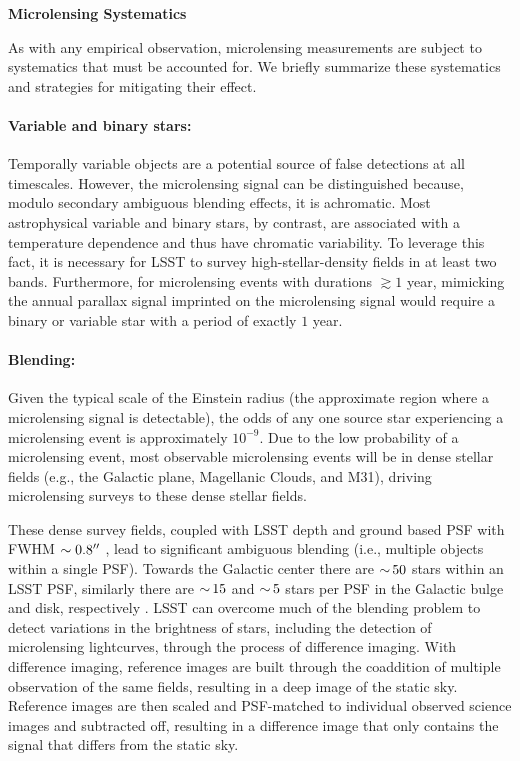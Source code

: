 \noindent \textbf{Microlensing Systematics}

As with any empirical observation, microlensing measurements are subject to systematics that must be accounted for.
We briefly summarize these systematics and strategies for mitigating their effect.

\paragraph{Variable and binary stars:} Temporally variable objects are a potential source of false detections at all timescales. However, the microlensing signal can be distinguished because, modulo secondary ambiguous blending effects, it is achromatic. Most astrophysical variable and binary stars, by contrast, are associated with a temperature dependence and thus have chromatic variability. To leverage this fact, it is necessary for LSST to survey high-stellar-density fields in at least two bands. Furthermore, for microlensing events with durations $\gtrsim 1$ year, mimicking the annual parallax signal imprinted on the microlensing signal would require a binary or variable star with a period of exactly $1$ year.

\paragraph{Blending:} Given the typical scale  of the Einstein radius (the approximate region where a microlensing signal is detectable), the odds of any one source star experiencing a microlensing event is approximately $10^{-9}$. Due to the low probability of a microlensing event, most observable microlensing events will be in dense stellar fields (e.g., the Galactic plane, Magellanic Clouds, and M31), driving microlensing surveys to these dense stellar fields.

These dense survey fields, coupled with LSST depth and ground based PSF with FWHM $\sim 0.8 ''$ \citep{0805.2366}, lead to significant ambiguous blending (i.e., multiple objects within a single PSF).
Towards the Galactic center there are $ {\sim}\, 50$ stars within an LSST PSF, similarly there are $ {\sim}\, 15$ and $ {\sim}\, 5$ stars per PSF in the Galactic bulge and disk, respectively \citep{1806.06372}.
LSST can overcome much of the blending problem to detect variations in the brightness of stars, including the detection of microlensing lightcurves, through the process of difference imaging.
With difference imaging, reference images are built through the coaddition of multiple observation of the same fields, resulting in a deep image of the static sky. Reference images are then scaled and PSF-matched to individual observed science images and subtracted off, resulting in a difference image that only contains the signal that differs from the static sky. 

